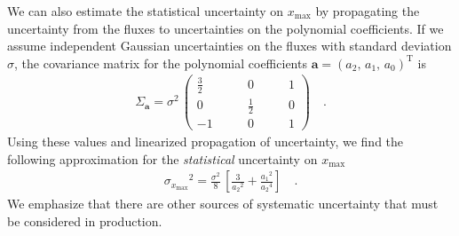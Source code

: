 \documentclass[rnaas]{aastex62}
\newcommand{\figurelabel}[1]{\label{fig:#1}}
\renewcommand{\eqref}[1]{\ref{eq:#1}}
\newcommand{\Eq}[1]{Equation~(\eqref{#1})}
\newcommand{\eq}[1]{\Eq{#1}}
\newcommand{\T}{\ensuremath{\mathrm{T}}}
\newcommand{\bvec}[1]{{\ensuremath{\boldsymbol{#1}}}}
\begin{document}
We can also estimate the statistical uncertainty on $x_\mathrm{max}$ by
propagating the uncertainty from the fluxes to uncertainties on the polynomial
coefficients.
If we assume independent Gaussian uncertainties on the fluxes with standard
deviation $\sigma$, the covariance matrix for the polynomial coefficients
$\bvec{a} = {(a_2,\,a_1,\,a_0)}^\T$ is
\begin{eqnarray}
\Sigma_\bvec{a} = \sigma^2\,\left(\begin{array}{ccc}
\frac{3}{2} \quad & \quad 0 \quad &\quad 1 \\
0\quad &\quad \frac{1}{2}\quad &\quad 0 \\
-1\quad &\quad 0\quad &\quad 1
\end{array}\right)\quad.
\end{eqnarray}
Using these values and linearized propagation of uncertainty, we find the
following approximation for the \emph{statistical} uncertainty on
$x_\mathrm{max}$
\begin{eqnarray}
{\sigma_{x_\mathrm{max}}}^2 = \frac{\sigma^2}{8}\,\left[
    \frac{3}{{a_2}^2} + \frac{{a_1}^2}{{a_2}^4}
\right]\quad.
\end{eqnarray}
We emphasize that there are other sources of systematic uncertainty that must
be considered in production.





\end{document}
